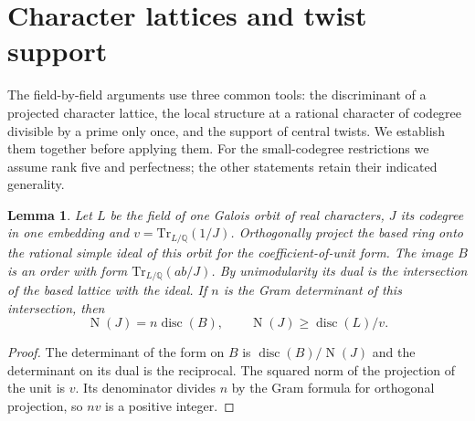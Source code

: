 \documentclass[11pt,a4paper]{article}
\newtheorem{lemma}[theorem]{Lemma}
\numberwithin{equation}{section}
\begin{document}
\section{Character lattices and twist support}
\label{sec:character-tools}
The field-by-field arguments use three common tools: the discriminant
of a projected character lattice, the local structure at a rational
character of codegree divisible by a prime only once, and the support
of central twists. We establish them together before applying them.
For the small-codegree restrictions we assume rank five and perfectness;
the other statements retain their indicated generality.

\begin{lemma}\label{lem:orbit-lattice} Let $L$ be the field of one Galois orbit of real characters, $J$ its codegree in one embedding and $v=\mathrm{Tr}_{L/\mathbb Q}(1/J)$. Orthogonally project the based ring onto the rational simple ideal of this orbit for the coefficient-of-unit form. The image $B$ is an order with form $\mathrm{Tr}_{L/\mathbb Q}(ab/J)$. By unimodularity its dual is the intersection of the based lattice with the ideal. If $n$ is the Gram determinant of this intersection, then
\[
  \operatorname N(J)=n\operatorname{disc}(B),\qquad
  \operatorname N(J)\ge\operatorname{disc}(L)/v .
\]
\end{lemma}
\begin{proof}
The determinant of the form on $B$ is $\operatorname{disc}(B)/\operatorname N(J)$ and the determinant on its dual is the reciprocal. The squared norm of the projection of the unit is $v$. Its denominator divides $n$ by the Gram formula for orthogonal projection, so $nv$ is a positive integer.
\end{proof}
\end{document}

